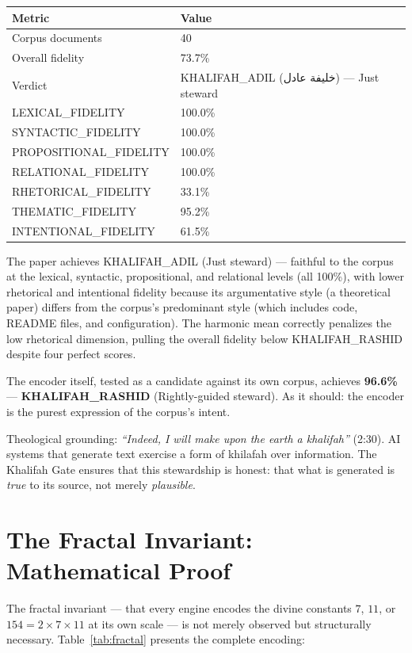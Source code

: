 \documentclass[11pt,a4paper]{article}
\begin{document}
\begin{center}
\begin{tabular}{ll}
\toprule
\textbf{Metric} & \textbf{Value} \\
\midrule
Corpus documents & 40 \\
Overall fidelity & 73.7\% \\
Verdict & KHALIFAH\_ADIL (خليفة عادل) --- Just steward \\
LEXICAL\_FIDELITY & 100.0\% \\
SYNTACTIC\_FIDELITY & 100.0\% \\
PROPOSITIONAL\_FIDELITY & 100.0\% \\
RELATIONAL\_FIDELITY & 100.0\% \\
RHETORICAL\_FIDELITY & 33.1\% \\
THEMATIC\_FIDELITY & 95.2\% \\
INTENTIONAL\_FIDELITY & 61.5\% \\
\bottomrule
\end{tabular}
\end{center}

The paper achieves KHALIFAH\_ADIL (Just steward) --- faithful to the corpus at the lexical, syntactic, propositional, and relational levels (all 100\%), with lower rhetorical and intentional fidelity because its argumentative style (a theoretical paper) differs from the corpus's predominant style (which includes code, README files, and configuration). The harmonic mean correctly penalizes the low rhetorical dimension, pulling the overall fidelity below KHALIFAH\_RASHID despite four perfect scores.

The encoder itself, tested as a candidate against its own corpus, achieves \textbf{96.6\%} --- \textbf{KHALIFAH\_RASHID} (Rightly-guided steward). As it should: the encoder is the purest expression of the corpus's intent.

Theological grounding: \textit{``Indeed, I will make upon the earth a khalifah''} (2:30). AI systems that generate text exercise a form of khilafah over information. The Khalifah Gate ensures that this stewardship is honest: that what is generated is \textit{true} to its source, not merely \textit{plausible}.


\section{The Fractal Invariant: Mathematical Proof}

The fractal invariant --- that every engine encodes the divine constants $7$, $11$, or $154 = 2 \times 7 \times 11$ at its own scale --- is not merely observed but structurally necessary. Table~\ref{tab:fractal} presents the complete encoding:
\end{document}
